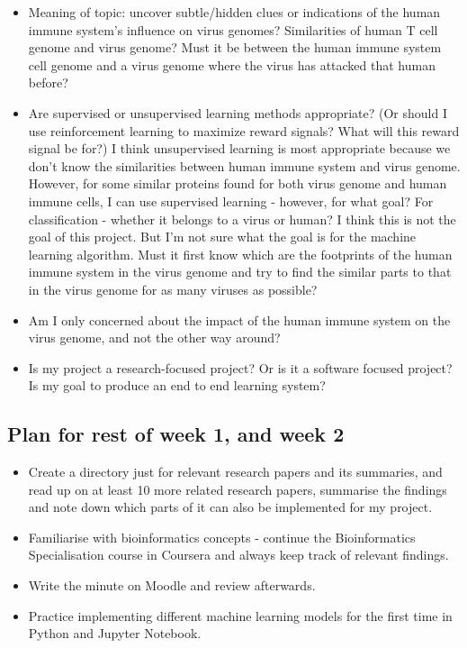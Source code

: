 \documentclass[11pt]{article}
\begin{document}
\begin{itemize}
\item Meaning of topic: uncover subtle/hidden clues or indications of the human immune system's influence on virus genomes? Similarities of human T cell genome and virus genome? Must it be between the human immune system cell genome and a virus genome where the virus has attacked that human before?
\item Are supervised or unsupervised learning methods appropriate? (Or should I use reinforcement learning to maximize reward signals? What will this reward signal be for?) I think unsupervised learning is most appropriate because we don’t know the similarities between human immune system and virus genome. However, for some similar proteins found for both virus genome and human immune cells, I can use supervised learning - however, for what goal? For classification - whether it belongs to a virus or human? I think this is not the goal of this project. But I’m not sure what the goal is for the machine learning algorithm. Must it first know which are the footprints of the human immune system in the virus genome and try to find the similar parts to that in the virus genome for as many viruses as possible?
\item Am I only concerned about the impact of the human immune system on the virus genome, and not the other way around?
\item Is my project a research-focused project? Or is it a software focused project? Is my goal to produce an end to end learning system?
\end{itemize}

\subsection{Plan for rest of week 1, and week 2}\label{plan}

\begin{itemize}
\item Create a directory just for relevant research papers and its summaries, and read up on at least 10 more related research papers, summarise the findings and note down which parts of it can also be implemented for my project.
\item Familiarise with bioinformatics concepts - continue the Bioinformatics Specialisation course in Coursera and always keep track of relevant findings.
\item Write the minute on Moodle and review afterwards.
\item Practice implementing different machine learning models for the first time in Python and Jupyter Notebook.
\end{itemize}
\end{document}
